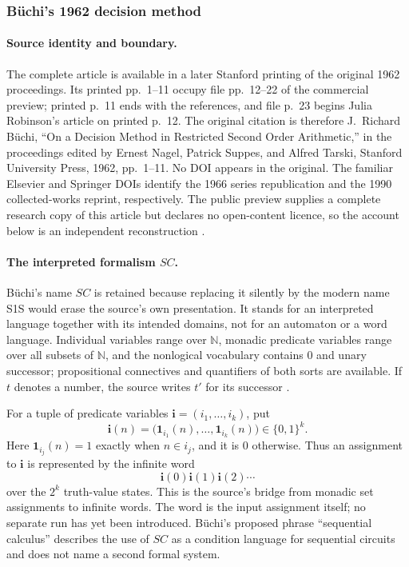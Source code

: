 \subsubsection{B\"uchi's 1962 decision method}

\paragraph{Source identity and boundary.}
The complete article is available in a later Stanford printing of the original
1962 proceedings.  Its printed pp.~1--11 occupy file pp.~12--22 of the
commercial preview; printed p.~11 ends with the references, and file p.~23
begins Julia Robinson's article on printed p.~12.  The original citation is
therefore J.~Richard B\"uchi, ``On a Decision Method in Restricted Second Order
Arithmetic,'' in the proceedings edited by Ernest Nagel, Patrick Suppes, and
Alfred Tarski, Stanford University Press, 1962, pp.~1--11.  No DOI appears in
the original.  The familiar Elsevier and Springer DOIs identify the 1966
series republication and the 1990 collected-works reprint, respectively.  The
public preview supplies a complete research copy of this article but declares
no open-content licence, so the account below is an independent reconstruction
\cite{Buchi1962}.

\paragraph{The interpreted formalism \(SC\).}
B\"uchi's name \(SC\) is retained because replacing it silently by the modern
name S1S would erase the source's own presentation.  It stands for an
interpreted language together with its intended domains, not for an automaton
or a word language.  Individual variables range over \(\mathbb N\), monadic
predicate variables range over all subsets of \(\mathbb N\), and the
nonlogical vocabulary contains \(0\) and unary successor; propositional
connectives and quantifiers of both sorts are available.  If \(t\) denotes a
number, the source writes \(t'\) for its successor
\cite[pp.~1--2]{Buchi1962}.

For a tuple of predicate variables
\(\mathbf i=(i_1,\ldots,i_k)\), put
\[
 \mathbf i(n)=
 \bigl(\mathbf 1_{i_1}(n),\ldots,\mathbf 1_{i_k}(n)\bigr)
 \in\{0,1\}^k.
\]
Here \(\mathbf 1_{i_j}(n)=1\) exactly when \(n\in i_j\), and it is \(0\)
otherwise.
Thus an assignment to \(\mathbf i\) is represented by the infinite word
\[
 \mathbf i(0)\mathbf i(1)\mathbf i(2)\cdots
\]
over the \(2^k\) truth-value states.  This is the source's bridge from monadic
set assignments to infinite words.  The word is the input assignment itself;
no separate run has yet been introduced.  B\"uchi's proposed phrase
``sequential calculus'' describes the use of \(SC\) as a condition language
for sequential circuits and does not name a second formal system.

